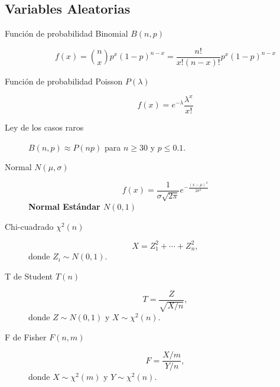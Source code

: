 \begin{multicols*}{2}
\subsection*{Variables Aleatorias}

\begin{tcolorbox}[hbox, title=Discretas]
\begin{minipage}{0.4\textwidth}
\begin{description}
\item [Función de probabilidad Binomial $B(n,p)$]
      \[f(x)=\binom{n}{x}p^x (1-p)^{n-x}=\dfrac{n!}{x!(n-x)!}p^x (1-p)^{n-x}\]
\item [Función de probabilidad Poisson $P(\lambda)$]
      \[f(x)=e^{-\lambda}\frac{\lambda^x}{x!}\]
\item [Ley de los casos raros] $B(n,p)\approx P(np)$ para $n\geq 30$ y $p\leq 0.1$.
\end{description}
\end{minipage}
\end{tcolorbox}

\begin{tcolorbox}[hbox, title=Continuas]
\begin{minipage}{0.4\textwidth}
\begin{description}
\item[Normal $N(\mu,\sigma)$]
      \[f(x)= \frac{1}{\sigma\sqrt{2\pi}}e^{-\frac{(x-\mu)^2}{2\sigma^2}}\]
      \textbf{Normal Estándar $N(0,1)$}
\item[Chi-cuadrado $\chi^2(n)$]
      \[X = Z_1^2+\cdots +Z_n^2,\]
      donde $Z_i\sim N(0,1)$.
\item[T de Student $T(n)$]
      \[T = \frac{Z}{\sqrt{X/n}},\]
      donde $Z\sim N(0,1)$ y $X\sim \chi^2(n)$.
\item[F de Fisher $F(n,m)$]
      \[F = \frac{X/m}{Y/n},\]
      donde $X\sim \chi^2(m)$ y $Y\sim \chi^2(n)$.
\end{description}
\end{minipage}
\end{tcolorbox}

\end{multicols*}